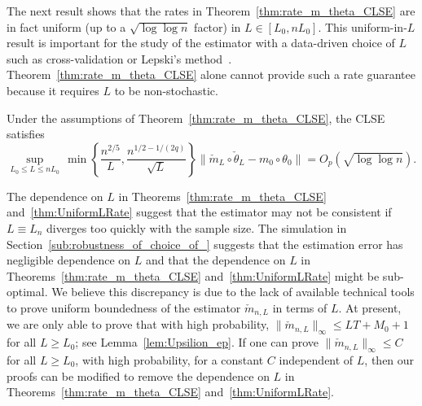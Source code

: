   The next result shows that the rates  in Theorem~\ref{thm:rate_m_theta_CLSE} are in fact uniform (up to a $\sqrt{\log\log n}$ factor) in $ L \in [L_0, n L_0]$.
This uniform-in-$L$ result is important for the study of the estimator with a data-driven choice of $L$ such as cross-validation or Lepski's method~\cite{lepski1997optimal}. Theorem~\ref{thm:rate_m_theta_CLSE} alone cannot provide such a rate guarantee because it requires $L$ to be non-stochastic.  


\begin{thm}\label{thm:UniformLRate}
Under the assumptions of Theorem~\ref{thm:rate_m_theta_CLSE}, the CLSE satisfies 
\begin{equation}\label{eq:UniformLRate}
\sup_{L_0 \le L \le nL_0}\,\min\left\{\frac{n^{2/5}}{L}, \frac{n^{1/2 - 1/(2q)}}{\sqrt{L}}\right\}\|\check{m}_L\circ\check{\theta}_L - m_0\circ\theta_0\| = O_p\left(\sqrt{\log\log n}\right).
\end{equation}
\end{thm}
\begin{remark}[Diverging $L$]\label{rem:DependenceonL}   The dependence on $L$ in Theorems~\ref{thm:rate_m_theta_CLSE} and~\ref{thm:UniformLRate} suggest that the estimator may not be consistent if $L \equiv L_n$ diverges too quickly with the sample size. The simulation in Section~\ref{sub:robustness_of_choice_of_} suggests that the estimation error has negligible dependence on $L$ and that the dependence on $L$ in Theorems~\ref{thm:rate_m_theta_CLSE} and~\ref{thm:UniformLRate} might be sub-optimal. We believe this discrepancy is due to the lack of available technical tools to prove uniform boundedness of the estimator $\check{m}_{n,L}$ in terms of $L$. At present, we are only able to prove that with high probability, $\|\check{m}_{n,L}\|_{\infty} \le LT + M_0 + 1$ for all $L \ge L_0$; see Lemma~\ref{lem:Upsilion_ep}. If one can prove $\|\check{m}_{n,L}\|_{\infty} \le C$ for all $L \ge L_0$, with high probability, for a constant $C $ independent of $L$, then our proofs can be modified to remove the dependence on $L$ in Theorems~\ref{thm:rate_m_theta_CLSE} and~\ref{thm:UniformLRate}. 
\end{remark}




